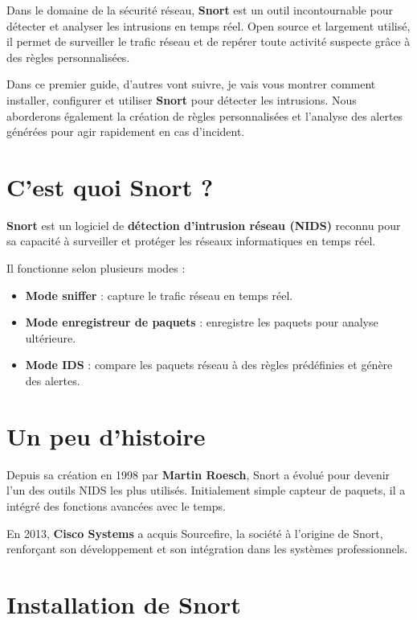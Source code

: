 \documentclass[12pt]{article}
\begin{document}
Dans le domaine de la sécurité réseau, \textbf{Snort} est un outil incontournable pour détecter et analyser les intrusions en temps réel. Open source et largement utilisé, il permet de surveiller le trafic réseau et de repérer toute activité suspecte grâce à des règles personnalisées.

Dans ce premier guide, d’autres vont suivre, je vais vous montrer comment installer, configurer et utiliser \textbf{Snort} pour détecter les intrusions. Nous aborderons également la création de règles personnalisées et l’analyse des alertes générées pour agir rapidement en cas d’incident.

\section{C’est quoi Snort ?}

\textbf{Snort} est un logiciel de \textbf{détection d’intrusion réseau (NIDS)} reconnu pour sa capacité à surveiller et protéger les réseaux informatiques en temps réel.

Il fonctionne selon plusieurs modes :
\begin{itemize}
  \item \textbf{Mode sniffer} : capture le trafic réseau en temps réel.
  \item \textbf{Mode enregistreur de paquets} : enregistre les paquets pour analyse ultérieure.
  \item \textbf{Mode IDS} : compare les paquets réseau à des règles prédéfinies et génère des alertes.
\end{itemize}

\section{Un peu d’histoire}

Depuis sa création en 1998 par \textbf{Martin Roesch}, Snort a évolué pour devenir l’un des outils NIDS les plus utilisés. Initialement simple capteur de paquets, il a intégré des fonctions avancées avec le temps.

En 2013, \textbf{Cisco Systems} a acquis Sourcefire, la société à l’origine de Snort, renforçant son développement et son intégration dans les systèmes professionnels.

\section{Installation de Snort}
\end{document}
